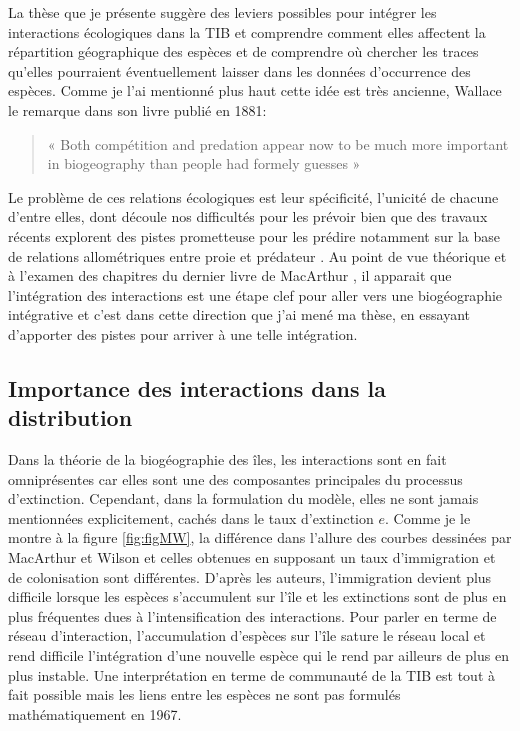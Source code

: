La thèse que je présente suggère des leviers possibles pour intégrer les
interactions écologiques dans la TIB et comprendre comment elles
affectent la répartition géographique des espèces et de comprendre où
chercher les traces qu'elles pourraient éventuellement laisser dans les
données d'occurrence des espèces. Comme je l'ai mentionné plus haut
cette idée est très ancienne, Wallace le remarque dans son livre publié
en 1881:

\begin{quote}
« Both compétition and predation appear now to be much more important in
biogeography than people had formely guesses »
\end{quote}

Le problème de ces relations écologiques est leur spécificité, l'unicité
de chacune d'entre elles, dont découle nos difficultés pour les prévoir
bien que des travaux récents explorent des pistes prometteuse pour les
prédire notamment sur la base de relations allométriques entre proie et
prédateur \citep{Gravel2013}. Au point de vue théorique et à l'examen
des chapitres du dernier livre de MacArthur
\citep{macarthur1972geographical}, il apparait que l'intégration des
interactions est une étape clef pour aller vers une biogéographie
intégrative et c'est dans cette direction que j'ai mené ma thèse, en
essayant d'apporter des pistes pour arriver à une telle intégration.

\subsection*{Importance des interactions dans la
distribution}\label{importance-des-interactions-dans-la-distribution}

Dans la théorie de la biogéographie des îles, les interactions sont en
fait omniprésentes car elles sont une des composantes principales du
processus d'extinction. Cependant, dans la formulation du modèle, elles
ne sont jamais mentionnées explicitement, cachés dans le taux
d'extinction \(e\). Comme je le montre à la figure \ref{fig:figMW}, la
différence dans l'allure des courbes dessinées par MacArthur et Wilson
et celles obtenues en supposant un taux d'immigration et de colonisation
sont différentes. D'après les auteurs, l'immigration devient plus
difficile lorsque les espèces s'accumulent sur l'île et les extinctions
sont de plus en plus fréquentes dues à l'intensification des
interactions. Pour parler en terme de réseau d'interaction,
l'accumulation d'espèces sur l'île sature le réseau local et rend
difficile l'intégration d'une nouvelle espèce qui le rend par ailleurs
de plus en plus instable. Une interprétation en terme de communauté de
la TIB est tout à fait possible mais les liens entre les espèces ne sont
pas formulés mathématiquement en 1967.

